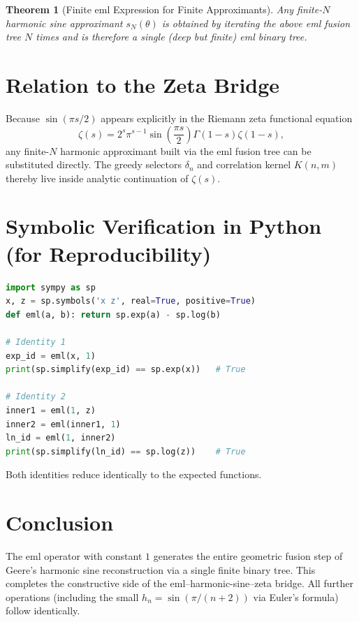 \documentclass[11pt,a4paper]{article}
\newtheorem{theorem}{Theorem}
\begin{document}
\begin{theorem}[Finite eml Expression for Finite Approximants]
Any finite-$N$ harmonic sine approximant $s_N(\theta)$ is obtained by iterating the above eml fusion tree $N$ times and is therefore a single (deep but finite) eml binary tree.
\end{theorem}

\section{Relation to the Zeta Bridge}
Because $\sin(\pi s/2)$ appears explicitly in the Riemann zeta functional equation
\[
\zeta(s) = 2^s \pi^{s-1} \sin\left(\frac{\pi s}{2}\right) \Gamma(1-s) \zeta(1-s),
\]
any finite-$N$ harmonic approximant built via the eml fusion tree can be substituted directly. The greedy selectors $\delta_n$ and correlation kernel $K(n,m)$ thereby live inside analytic continuation of $\zeta(s)$.

\section{Symbolic Verification in Python (for Reproducibility)}
\begin{lstlisting}[language=Python, caption=Symbolic verification of base identities]
import sympy as sp
x, z = sp.symbols('x z', real=True, positive=True)
def eml(a, b): return sp.exp(a) - sp.log(b)

# Identity 1
exp_id = eml(x, 1)
print(sp.simplify(exp_id) == sp.exp(x))   # True

# Identity 2
inner1 = eml(1, z)
inner2 = eml(inner1, 1)
ln_id = eml(1, inner2)
print(sp.simplify(ln_id) == sp.log(z))    # True
\end{lstlisting}

Both identities reduce identically to the expected functions.

\section{Conclusion}
The eml operator with constant $1$ generates the entire geometric fusion step of Geere's harmonic sine reconstruction via a single finite binary tree. This completes the constructive side of the eml--harmonic-sine--zeta bridge. All further operations (including the small $h_n = \sin(\pi/(n+2))$ via Euler's formula) follow identically.
\end{document}
